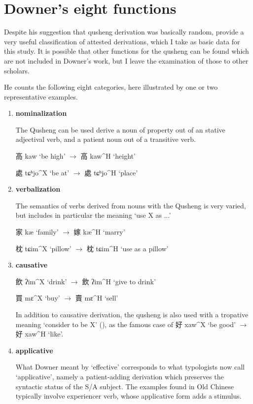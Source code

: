 \documentclass[oldfontcommands,oneside,a4paper,11pt]{article}
\newcommand{\ipa}[1]{{\phon \mbox{#1}}} %
\newcommand{\zh}[1]{{\cn #1}}
\newcommand{\ch}[3]{\zh{#1} \ipa{#2} `#3'}
\begin{document}
\section{Downer's eight functions}
Despite his suggestion that qusheng derivation was basically random, \citet{downer59} provide a very useful classification of attested derivations, which I take as basic data for this study. It is possible that other functions for the qusheng can be found which are not included in Downer's work, but I leave the examination of those to other scholars.

He counts the following eight categories, here illustrated by one or two representative examples.

\begin{enumerate}
\item \textbf{nominalization}

The Qusheng can be used derive a noun of property out of an stative adjectival verb, and a patient noun out of a transitive verb.

\ch{高}{kaw}{be high} $\rightarrow$ \ch{高}{kaw^H}{height} 

\ch{處}{tɕʰjo^X}{be at} $\rightarrow$ \ch{處}{tɕʰjo^H}{place} 

\item \textbf{verbalization} 

The semantics of verbs derived from nouns with the Qusheng is very varied, but includes in particular the meaning `use X as ...'

\ch{家}{kæ}{family} $\rightarrow$ \ch{嫁}{kæ^H}{marry} 

\ch{枕}{tɕim^X}{pillow} $\rightarrow$ \ch{枕}{tɕim^H}{use as a pillow} 

\item \textbf{causative}

\ch{飲}{ʔim^X}{drink} $\rightarrow$ \ch{飲}{ʔim^H}{give to drink} 

\ch{買}{mɛ^X}{buy} $\rightarrow$ \ch{賣}{mɛ^H}{sell} 

In addition to causative derivation, the qusheng is also used with a tropative meaning `consider to be X' (\citealt{jacques13tropative}), as the famous case of \ch{好}{xaw^X}{be good} $\rightarrow$ \ch{好}{xaw^H}{like}.

\item \textbf{applicative} 

What Downer meant by `effective' corresponds to what typologists now call `applicative', namely a patient-adding derivation which preserves the syntactic status of the S/A subject. The examples found in Old Chinese typically involve experiencer verb, whose applicative form adds a stimulus.


\end{enumerate}
\end{document}

